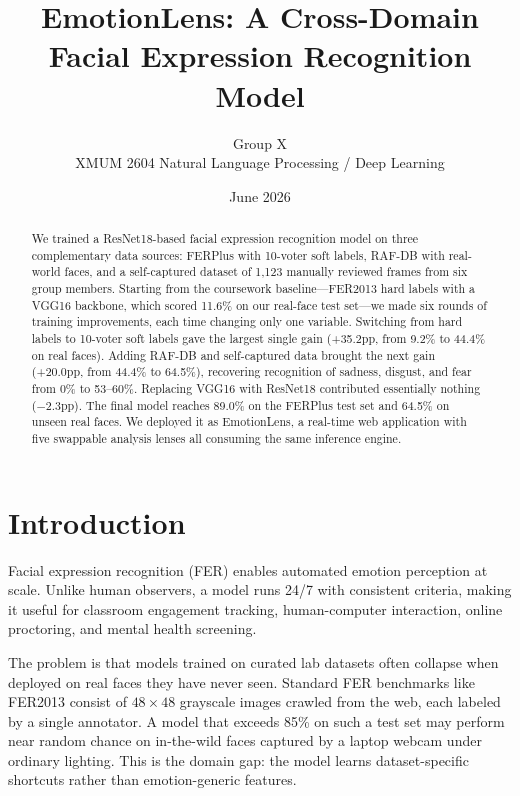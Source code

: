 \documentclass[12pt,a4paper]{article}
\title{\textbf{EmotionLens: A Cross-Domain Facial Expression Recognition Model}}
\author{Group X \\ XMUM 2604 Natural Language Processing / Deep Learning}
\date{June 2026}
\begin{document}
\maketitle

\begin{abstract}
We trained a ResNet18-based facial expression recognition model on three complementary data sources: FERPlus with 10-voter soft labels, RAF-DB with real-world faces, and a self-captured dataset of 1,123 manually reviewed frames from six group members. Starting from the coursework baseline---FER2013 hard labels with a VGG16 backbone, which scored 11.6\% on our real-face test set---we made six rounds of training improvements, each time changing only one variable. Switching from hard labels to 10-voter soft labels gave the largest single gain (+35.2pp, from 9.2\% to 44.4\% on real faces). Adding RAF-DB and self-captured data brought the next gain (+20.0pp, from 44.4\% to 64.5\%), recovering recognition of sadness, disgust, and fear from 0\% to 53--60\%. Replacing VGG16 with ResNet18 contributed essentially nothing ($-$2.3pp). The final model reaches 89.0\% on the FERPlus test set and 64.5\% on unseen real faces. We deployed it as EmotionLens, a real-time web application with five swappable analysis lenses all consuming the same inference engine.
\end{abstract}

\tableofcontents
\newpage

\section{Introduction}

Facial expression recognition (FER) enables automated emotion perception at scale. Unlike human observers, a model runs 24/7 with consistent criteria, making it useful for classroom engagement tracking, human-computer interaction, online proctoring, and mental health screening.

The problem is that models trained on curated lab datasets often collapse when deployed on real faces they have never seen. Standard FER benchmarks like FER2013 consist of $48\times48$ grayscale images crawled from the web, each labeled by a single annotator. A model that exceeds 85\% on such a test set may perform near random chance on in-the-wild faces captured by a laptop webcam under ordinary lighting. This is the domain gap: the model learns dataset-specific shortcuts rather than emotion-generic features.
\end{document}
